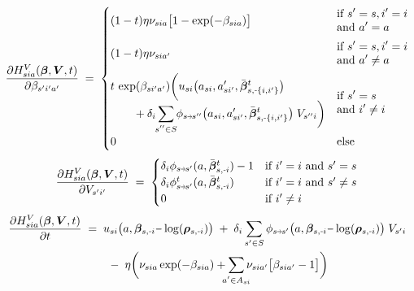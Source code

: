 \documentclass[11pt,fleqn]{article}
\newcommand{\bbeta}{\bm{\beta}}
\newcommand{\brho}{\bm{\rho}}
\newcommand{\bV}{\bm{V}}
\newcommand{\shortminus}{{\text{\scalebox{0.4}[1.0]{\(-\)}}}}
\newcommand{\minusi}{\shortminus i}
\newcommand{\mediumminus}{{\text{\scalebox{0.8}[1.0]{\(-\)}}}}
\newcommand{\shortrightarrow}{\parbox{4pt}{\tikz{\draw[->](0,0)--(4pt,0);}}}
\newcommand{\phiss}{\phi_{s\shortrightarrow s'}}
\begin{document}
\begin{align*}
	\frac{ \partial H^V_{sia}(\bbeta,\bV,t) }{ \partial \beta_{s'i'a'} } \;=\; 
		\begin{cases}
			\begin{aligned}
				& (1-t)\eta \nu_{sia} \bigl[1-\exp(-\beta_{sia})\bigr]
			\end{aligned} & 
			\begin{aligned}
				& \text{if } s'=s, i'=i \\ &\text{and } a'=a
			\end{aligned} \\[1em]
			\begin{aligned}
				& (1-t)\eta \nu_{sia'}
			\end{aligned} & 
			\begin{aligned}
				& \text{if } s'=s, i'=i \\ &\text{and } a'\neq a
			\end{aligned} \\[1em]
			\begin{aligned} 
				& t \, \exp(\beta_{si'a'}) \biggl( u_{si}\bigl(a_{si},a_{si'}',\bar{\bbeta}^t_{s,\shortminus\{i,i'\}}\bigr) \\
				& \qquad + \delta_i \sum\limits_{\mathclap{s''\in S}} \phi_{s\shortrightarrow s''}\bigl(a_{si},a_{si'}',\bar{\bbeta}^t_{s,\shortminus\{i,i'\}}\bigr) \; V_{s''i} \biggr)
			\end{aligned} & 
			\begin{aligned}
				& \text{if } s'=s \\ &\text{and } i'\neq i  
			\end{aligned} \\[1em]
			0 & \text{else}
		\end{cases}
\end{align*}
\begin{align*}
	\frac{ \partial H^V_{sia}(\bbeta,\bV,t) }{ \partial V_{s'i'} } \;=\;
		\begin{cases}
			\delta_i \phiss(a,\bar{\bbeta}^t_{s,\minusi}) - 1 &\text{if } i'=i \text{ and } s'=s \\
			\delta_i \phiss^t(a,\bar{\bbeta}^t_{s,\minusi}) &\text{if } i'=i \text{ and } s'\neq s \\
			0 &\text{if } i'\neq i
		\end{cases}
\end{align*}
\begin{align*}
	\frac{\partial H^V_{sia}(\bbeta,\bV,t) }{ \partial t } & \;=\; 
		u_{si}\bigl(a,\bbeta_{s,\minusi} \mediumminus \log(\brho_{s,\minusi})\bigr) \;+\; \delta_i \sum\limits_{s'\in S} \phiss\bigl(a,\bbeta_{s,\minusi} \mediumminus \log(\brho_{s,\minusi})\bigr) \; V_{s'i} \\
		& \qquad \;-\; \eta \biggl( \nu_{sia}\exp(-\beta_{sia}) + \sum\limits_{\mathclap{a'\in A_{si}}} \nu_{sia'} \bigl[ \beta_{sia'} - 1 \bigr] \biggr)
\end{align*}
\end{document}
